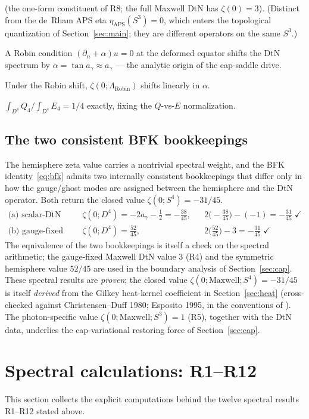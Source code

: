 \documentclass[11pt,a4paper]{article}
\theoremstyle{plain}
\theoremstyle{definition}
\theoremstyle{remark}
\newcommand{\ag}{a_\gamma}
\begin{document}
\begin{description}[leftmargin=2.6em,nosep,itemsep=2pt]
(the one-form constituent of R8; the full Maxwell DtN has $\zeta(0)=3$). (Distinct
from the de~Rham APS eta $\eta_{\mathrm{APS}}(S^3)=0$, which enters the topological quantization
of Section~\ref{sec:main}; they are different operators on the same $S^3$.)
\item[R10.] A Robin condition $(\partial_n + \alpha)u = 0$ at the deformed equator shifts the DtN
spectrum by $\alpha = \tan\ag \approx \ag$ --- the analytic origin of the cap-saddle drive.
\item[R11.] Under the Robin shift, $\zeta(0;\Lambda_{\mathrm{Robin}})$ shifts linearly in $\alpha$.
\item[R12.] $\int_{D^4} Q_4 / \int_{D^4} E_4 = 1/4$ exactly, fixing the $Q$-vs-$E$ normalization.
\end{description}

\subsection{The two consistent BFK bookkeepings}
\label{sec:two-books}
The hemisphere zeta value carries a nontrivial spectral weight, and the BFK
identity~\eqref{eq:bfk} admits two internally consistent bookkeepings that differ only in how
the gauge/ghost modes are assigned between the hemisphere and the DtN operator. Both return the
closed value $\zeta(0;S^4)=-31/45$.
\begin{align}
\text{(a) scalar-DtN split:}\quad
&\zeta(0;D^4) = -2\ag - \tfrac12 = -\tfrac{38}{45},
&&2\big(-\tfrac{38}{45}\big) - (-1) = -\tfrac{31}{45}\;\checkmark \\
\text{(b) gauge-fixed Maxwell split:}\quad
&\zeta(0;D^4) = \tfrac{52}{45},
&&2\big(\tfrac{52}{45}\big) - 3 = -\tfrac{31}{45}\;\checkmark
\end{align}
The equivalence of the two bookkeepings is itself a check on the spectral arithmetic; the
gauge-fixed Maxwell DtN value $3$ (R4) and the symmetric hemisphere value $52/45$ are used in
the boundary analysis of Section~\ref{sec:cap}. These spectral results are \emph{proven}; the
closed value $\zeta(0;\mathrm{Maxwell};S^4) = -31/45$ is itself \emph{derived} from the Gilkey
heat-kernel coefficient in Section~\ref{sec:heat} (cross-checked against Christensen--Duff 1980;
Esposito 1995, in the conventions of \cite{Vassilevich2003}). The
photon-specific value $\zeta(0;\mathrm{Maxwell};S^3)=1$ (R5), together with the DtN data,
underlies the cap-variational restoring force of Section~\ref{sec:cap}.

\section{Spectral calculations: R1--R12}
\label{sec:spectraldetail}
This section collects the explicit computations behind the twelve spectral results R1--R12
stated above.
\end{document}
